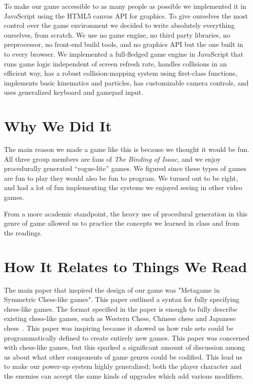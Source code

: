 \documentclass[a4paper, 12pt]{article}
\begin{document}
To make our game accessible to as many people as possible we implemented it in
JavaScript using the HTML5 canvas API for graphics. To give ourselves the most
control over the game environment we decided to write absolutely everything
ourselves, from scratch. We use no game engine, no third party libraries, no
preprocessor, no front-end build tools, and no graphics API but the one built in
to every browser. We implemented a full-fledged game engine in JavaScript that
runs game logic independent of screen refresh rate, handles collisions in an
efficient way, has a robust collision-mapping system using first-class
functions, implements basic kinematics and particles, has customizable camera
controls, and uses generalized keyboard and gamepad input.

\section{Why We Did It}

The main reason we made a game like this is because we thought it would be fun.
All three group members are fans of \textit{The Binding of Isaac}, and we enjoy
procedurally generated ``rogue-lite'' games. We figured since these types of
games are fun to play they would also be fun to program. We turned out to be
right, and had a lot of fun implementing the systems we enjoyed seeing in other
video games.

From a more academic standpoint, the heavy use of procedural generation in this
genre of game allowed us to practice the concepts we learned in class and from
the readings.


\section{How It Relates to Things We Read}

The main paper that inspired the design of our game was "Metagame in Symmetric
Chess-like games". This paper outlined a syntax for fully specifying chess-like
games. The format specified in the paper is enough to fully describe existing
chess-like games, such as Western Chess, Chinese chess and Japanese
chess~\autocite{pell1992}. This paper was inspiring because it showed us how
rule sets could be programmatically defined to create entirely new games. This
paper was concerned with chess-like games, but this sparked a significant amount
of discussion among us about what other components of game genres could be
codified. This lead us to make our power-up system highly generalized; both the
player character and the enemies can accept the same kinds of upgrades which add
various modifiers.
\end{document}
